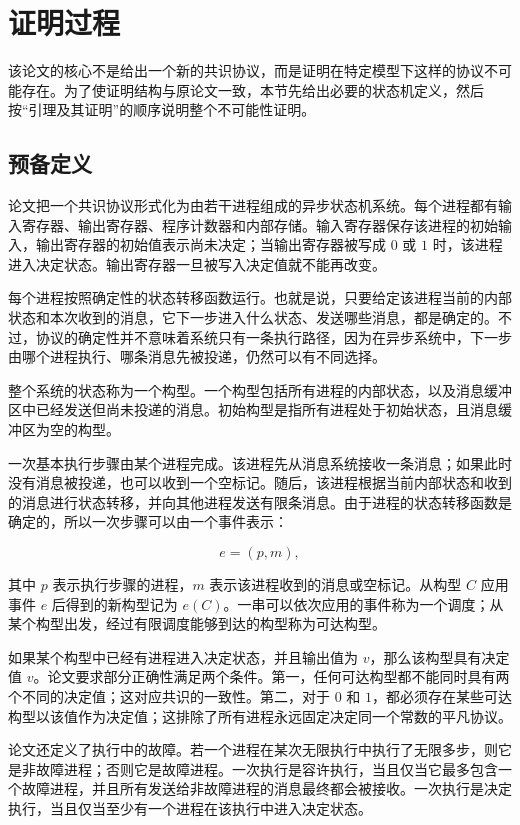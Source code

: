 \section{证明过程}

该论文的核心不是给出一个新的共识协议，而是证明在特定模型下这样的协议不可能存在。为了使证明结构与原论文一致，本节先给出必要的状态机定义，然后按“引理及其证明”的顺序说明整个不可能性证明。

\subsection{预备定义}

论文把一个共识协议形式化为由若干进程组成的异步状态机系统。每个进程都有输入寄存器、输出寄存器、程序计数器和内部存储。输入寄存器保存该进程的初始输入，输出寄存器的初始值表示尚未决定；当输出寄存器被写成 $0$ 或 $1$ 时，该进程进入决定状态。输出寄存器一旦被写入决定值就不能再改变。

每个进程按照确定性的状态转移函数运行。也就是说，只要给定该进程当前的内部状态和本次收到的消息，它下一步进入什么状态、发送哪些消息，都是确定的。不过，协议的确定性并不意味着系统只有一条执行路径，因为在异步系统中，下一步由哪个进程执行、哪条消息先被投递，仍然可以有不同选择。

整个系统的状态称为一个构型。一个构型包括所有进程的内部状态，以及消息缓冲区中已经发送但尚未投递的消息。初始构型是指所有进程处于初始状态，且消息缓冲区为空的构型。

一次基本执行步骤由某个进程完成。该进程先从消息系统接收一条消息；如果此时没有消息被投递，也可以收到一个空标记。随后，该进程根据当前内部状态和收到的消息进行状态转移，并向其他进程发送有限条消息。由于进程的状态转移函数是确定的，所以一次步骤可以由一个事件表示：

\[
e=(p,m),
\]

其中 $p$ 表示执行步骤的进程，$m$ 表示该进程收到的消息或空标记。从构型 $C$ 应用事件 $e$ 后得到的新构型记为 $e(C)$。一串可以依次应用的事件称为一个调度；从某个构型出发，经过有限调度能够到达的构型称为可达构型。

如果某个构型中已经有进程进入决定状态，并且输出值为 $v$，那么该构型具有决定值 $v$。论文要求部分正确性满足两个条件。第一，任何可达构型都不能同时具有两个不同的决定值；这对应共识的一致性。第二，对于 $0$ 和 $1$，都必须存在某些可达构型以该值作为决定值；这排除了所有进程永远固定决定同一个常数的平凡协议。

论文还定义了执行中的故障。若一个进程在某次无限执行中执行了无限多步，则它是非故障进程；否则它是故障进程。一次执行是容许执行，当且仅当它最多包含一个故障进程，并且所有发送给非故障进程的消息最终都会被接收。一次执行是决定执行，当且仅当至少有一个进程在该执行中进入决定状态。

